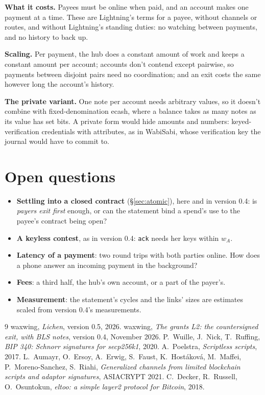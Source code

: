 \documentclass[11pt]{article}
\theoremstyle{plain}
\theoremstyle{definition}
\newcommand{\tx}[1]{\texttt{#1}}
\begin{document}
\textbf{What it costs.} Payees must be online when paid, and an account
makes one payment at a time. These are Lightning's terms for a payee,
without channels or routes, and without Lightning's standing duties:
no watching between payments, and no history to back up.

\textbf{Scaling.} Per payment, the hub does a constant amount of work
and keeps a constant amount per account; accounts don't contend except
pairwise, so payments between disjoint pairs need no coordination; and
an exit costs the same however long the account's history.

\textbf{The private variant.} One note per account needs arbitrary
values, so it doesn't combine with fixed-denomination ecash, where a
balance takes as many notes as its value has set bits. A private form
would hide amounts and numbers: keyed-verification credentials with
attributes, as in WabiSabi, whose verification key the journal would
have to commit to.

\section{Open questions}\label{sec:open}

\begin{itemize}[nosep]
\item \textbf{Settling into a closed contract} (\S\ref{sec:atomic}),
  here and in version 0.4: is \emph{payers exit first} enough, or can
  the statement bind a spend's use to the payee's contract being open?
\item \textbf{A keyless contest}, as in version 0.4: \tx{ack} needs her
  keys within $w_A$.
\item \textbf{Latency of a payment}: two round trips with both parties
  online. How does a phone answer an incoming payment in the background?
\item \textbf{Fees}: a third half, the hub's own account, or a part of
  the payer's.
\item \textbf{Measurement}: the statement's cycles and the links' sizes
  are estimates scaled from version 0.4's measurements.
\end{itemize}

\begin{thebibliography}{9}
 waxwing, \emph{Lichen}, version 0.5, 2026.
 waxwing, \emph{The grants L2: the countersigned exit,
  with BLS notes}, version 0.4, November 2026.
 P.~Wuille, J.~Nick, T.~Ruffing, \emph{BIP 340: Schnorr
  signatures for secp256k1}, 2020.
 A.~Poelstra, \emph{Scriptless scripts}, 2017.
 L.~Aumayr, O.~Ersoy, A.~Erwig, S.~Faust,
  K.~Hostáková, M.~Maffei, P.~Moreno-Sanchez, S.~Riahi,
  \emph{Generalized channels from limited blockchain scripts and
  adaptor signatures}, ASIACRYPT 2021.
 C.~Decker, R.~Russell, O.~Osuntokun, \emph{eltoo: a
  simple layer2 protocol for Bitcoin}, 2018.
\end{thebibliography}
\end{document}
